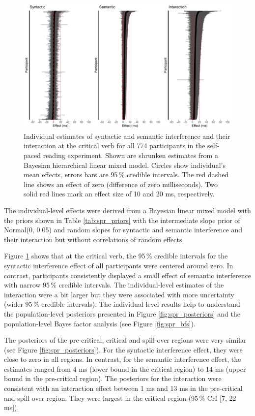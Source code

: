 \documentclass[a4paper, man, floatsintext]{apa7}
\begin{document}
\begin{figure}[H]
    \caption{Individual estimates of syntactic and semantic interference and their interaction at the critical verb for all 774 participants in the self-paced reading experiment. Shown are shrunken estimates from a Bayesian hierarchical linear mixed model. Circles show individual’s mean effects, errors bars are 95\,\% credible intervals. The red dashed line shows an effect of zero (difference of zero milliseconds). Two solid red lines mark an effect size of 10 and 20 ms, respectively.}
    \label{fig:spr_individual}
    \centering
    \includegraphics[width=\textwidth]{images/individual_diffs.jpg}
\end{figure}

The individual-level effects were derived from a Bayesian linear mixed model with the priors shown in Table \ref{tab:spr_priors} with the intermediate slope prior of Normal(0, 0.05) and random slopes for syntactic and semantic interference and their interaction but without correlations of random effects.

Figure \ref{fig:spr_individual} shows that at the critical verb, the 95\,\% credible intervals for the syntactic interference effect of all participants were centered around zero. In contrast, participants consistently displayed a small effect of semantic interference with narrow 95\,\% credible intervals. The individual-level estimates of the interaction were a bit larger but they were associated with more uncertainty (wider 95\,\% credible intervals). The individual-level results help to understand the population-level posteriors presented in Figure \ref{fig:spr_posteriors} and the population-level Bayes factor analysis (see Figure \ref{fig:spr_bfs}). 

The posteriors of the pre-critical, critical and spill-over regions were very similar (see Figure \ref{fig:spr_posteriors}). For the syntactic interference effect, they were close to zero in all regions. In contrast, for the semantic interference effect, the estimates ranged from 4 ms (lower bound in the critical region) to 14 ms (upper bound in the pre-critical region). The posteriors for the interaction were consistent with an interaction effect between 1 ms and 13 ms in the pre-critical and spill-over region. They were largest in the critical region (95\,\% CrI [7, 22 ms]). 
\end{document}
